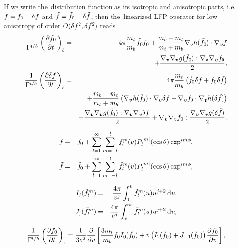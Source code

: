 \documentclass[preprint,12pt]{elsarticle}
\begin{document}
If we write the~distribution function as its isotropic and anisotropic parts, 
i.e. $f = f_0 + \delta f$ and $\tilde{f} = \tilde{f}_0 + \delta\tilde{f}$, 
then the~linearized LFP operator for low anisotropy of order 
$O(\delta f^2, \delta\tilde{f}^2)$ reads 
\begin{eqnarray}
  \frac{1}{\Gamma^{t/b}} \left(\frac{\partial{f_0}}{\partial{t}}\right)_{b} &=&  
  4\pi \frac{m_{t}}{m_b} \tilde{f}_0 f_0 
  + \frac{m_b - m_t}{m_t + m_b} \nabla_{\boldsymbol{v}}h(\tilde{f}_0)\cdot\nabla_{\boldsymbol{v}} f \nonumber \\ 
  &&+ \frac{\nabla_{\boldsymbol{v}}\nabla_{\boldsymbol{v}}g(\tilde{f}_0) : \nabla_{\boldsymbol{v}}\nabla_{\boldsymbol{v}} f_0}{2} ,
  \label{eq:FP_f0} \\ 
  \frac{1}{\Gamma^{t/b}}\left(\frac{\partial{\delta f}}{\partial{t}}\right)_{b} &=&  
  4\pi \frac{m_{t}}{m_b} 
  \left(\tilde{f}_0\delta f + f_0\delta\tilde{f}\right) \nonumber \\ 
  &&+ \frac{m_b - m_t}{m_t + m_b} 
  \left(\nabla_{\boldsymbol{v}}h(\tilde{f}_0)\cdot\nabla_{\boldsymbol{v}} \delta f + \nabla_{\boldsymbol{v}}f_0\cdot\nabla_{\boldsymbol{v}}h(\delta\tilde{f})\right)
  \nonumber \\ 
  &&+ \frac{\nabla_{\boldsymbol{v}}\nabla_{\boldsymbol{v}}g(\tilde{f}_0) : \nabla_{\boldsymbol{v}}\nabla_{\boldsymbol{v}} \delta f}{2} 
  + \nabla_{\boldsymbol{v}}\nabla_{\boldsymbol{v}} f_0 : \frac{\nabla_{\boldsymbol{v}}\nabla_{\boldsymbol{v}}g(\delta\tilde{f})}{2} .
  \label{eq:FP_deltaf} 
\end{eqnarray}

\begin{eqnarray}
  f &=& f_0 + \sum_{l=1}^\infty\sum_{m=-l}^l f^m_l(v) 
  P_l^{|m|}(\cos \theta) \exp^{i m \phi} ,
  \nonumber \\ 
  \tilde{f} &=& \tilde{f}_0 + \sum_{l=1}^\infty\sum_{m=-l}^l \tilde{f}^m_l(v) 
  P_l^{|m|}(\cos \theta) \exp^{i m \phi} ,
  \nonumber
\end{eqnarray}

\begin{eqnarray}
  I_j(\tilde{f}_l^m) &=& \frac{4\pi}{v^j} \int_0^v \tilde{f}_l^m(u) u^{j+2}
  \, \text{d} u ,
  \nonumber \\
  J_j(\tilde{f}_l^m) &=& \frac{4\pi}{v^j} \int_v^\infty 
  \tilde{f}_l^m(u) u^{j+2}\, \text{d} u ,
  \nonumber
\end{eqnarray}

\begin{equation}
  \frac{1}{\Gamma^{t/b}}\left(\frac{\partial{f_0}}{\partial{t}}\right)_{b} =
  \frac{1}{3v^2}\frac{\partial{}}{\partial{v}}\left[\frac{3 m_t}{m_b} 
  f_0 I_0(\tilde{f}_0) + v \left( I_2(\tilde{f}_0) + J_{-1}(\tilde{f}_0)\right)
  \frac{\partial{f_0}}{\partial{v}} \right] ,
  \nonumber
\end{equation}
\end{document}
